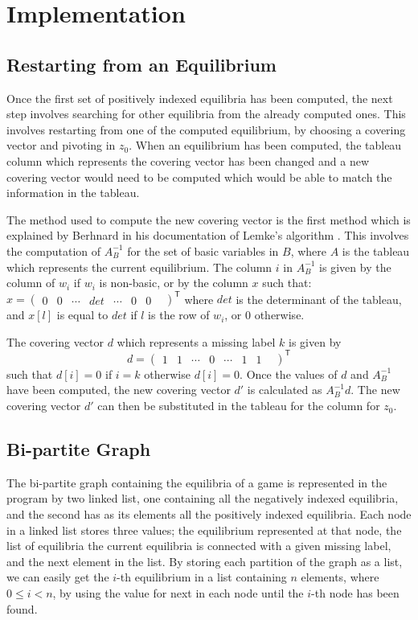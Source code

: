 \section{Implementation}
\subsection{Restarting from an Equilibrium}
Once the first set of positively indexed equilibria has been
computed, the next step involves searching for other equilibria
from the already computed ones. This involves restarting from one of
the computed equilibrium, by choosing a covering vector and
pivoting in $z_0$. When an equilibrium has been computed,
the tableau column which represents the covering vector has
been changed and a new covering vector would need to be
computed which would be able to match the information in the
tableau.

The method used to compute the new covering vector is the
first method which is explained by Berhnard in his documentation 
of Lemke's algorithm \cite{doculemke}.
This involves the computation of
$A_B^{-1}$ for the set of basic variables in $B$, where $A$ is
the tableau which represents the current equilibrium. The column
$i$ in $A_B^{-1}$ is given by the column of $w_i$ if $w_i$ is 
non-basic, or by the column $x$ such that:
$x = 
\begin{pmatrix}
    0 & 0 & \cdots & det & \cdots & 0 & 0 &
\end{pmatrix}^\mathsf{T}$
where $det$ is the determinant of the tableau, and $x[l]$ is 
equal to $det$ if $l$ is the row of $w_i$, or 0 otherwise.

The covering vector $d$ which represents a missing label $k$ is
given by 
\[d = 
\begin{pmatrix}
    1 & 1 & \cdots & 0 & \cdots & 1 & 1 &
\end{pmatrix}^\mathsf{T}\]
such that $d[i] = 0$ if $i = k$ otherwise $d[i] = 0$. Once the
values of $d$ and $A_B^{-1}$ have been computed, the new
covering vector $d'$ is calculated as $A_B^{-1}d$. The new
covering vector $d'$ can then be substituted in the tableau for
the column for $z_0$.

\subsection{Bi-partite Graph}
The bi-partite graph containing the equilibria of a game is 
represented in the program by two linked list, one containing
all the negatively indexed equilibria, and the second has as
its elements all the positively indexed equilibria. Each node in
a linked list stores three values; the equilibrium represented
at that node, the list of equilibria the current equilibria is
connected with a given missing label, and the next element in
the list. By storing each partition of the graph as a list,
we can easily get the $i$-th equilibrium in a list containing
$n$ elements, where $0 \leq i < n$, by using the value for
next in each node until the $i$-th node has been found.


